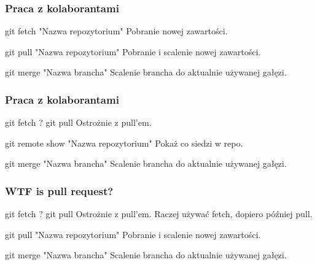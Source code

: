 \documentclass[9pt]{beamer}
\begin{document}
		
	\begin{frame}
		\frametitle{Praca z kolaborantami}

			\begin{block}{git fetch "Nazwa repozytorium"}
				Pobranie nowej zawartości.
			\end{block}

			\begin{block}{git pull "Nazwa repozytorium"}
				Pobranie i scalenie nowej zawartości.
			\end{block}	

			\begin{block}{git merge "Nazwa brancha"}
				Scalenie brancha do aktualnie używanej gałęzi.
			\end{block}	
			
					
						
	\end{frame}
	
		
	\begin{frame}
		\frametitle{Praca z kolaborantami}

			\begin{block}{git fetch ? git pull}
				Ostrożnie z pull'em.
			\end{block}

			\begin{block}{git remote show "Nazwa repozytorium"}
				Pokaż co siedzi w repo.
			\end{block}	

			\begin{block}{git merge "Nazwa brancha"}
				Scalenie brancha do aktualnie używanej gałęzi.
			\end{block}	
			
					
						
	\end{frame}
	
		
	\begin{frame}
		\frametitle{WTF is pull request?}

			\begin{block}{git fetch ? git pull}
				Ostrożnie z pull'em. Raczej używać fetch, dopiero później pull.
			\end{block}

			\begin{block}{git pull "Nazwa repozytorium"}
				Pobranie i scalenie nowej zawartości.
			\end{block}	

			\begin{block}{git merge "Nazwa brancha"}
				Scalenie brancha do aktualnie używanej gałęzi.
			\end{block}	
			
					
						
	\end{frame}
		
\end{document}

